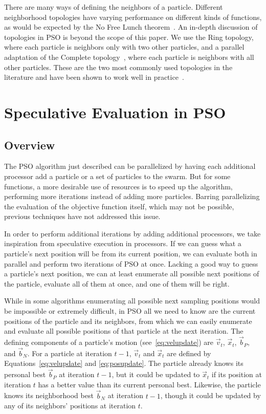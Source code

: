 \documentclass[conference,letterpaper]{IEEEtran}
\providecommand{\ppos}{\ensuremath{\Vec{x}}}
\providecommand{\pvel}{\ensuremath{\Vec{v}}}
\providecommand{\nbest}{\ensuremath{\Vec{b}_N}}
\providecommand{\pbest}{\ensuremath{\Vec{b}_P}}
\begin{document}
There are many ways of defining the neighbors of a particle.  Different
neighborhood topologies have varying performance on different kinds of
functions, as would be expected by the No Free Lunch
theorem~\cite{wolpert-tec97}.  An in-depth discussion of topologies in PSO is
beyond the scope of this paper.  We use the Ring topology, where each particle
is neighbors only with two other particles, and a parallel adaptation of the
Complete topology~\cite{mcnabb-cec09}, where each particle is neighbors with
all other particles.  These are the two most commonly used topologies in the
literature and have been shown to work well in practice~\cite{bratton-sis07}.

\section{Speculative Evaluation in PSO}
\label{sec:sepso}
\subsection{Overview}

The PSO algorithm just described can be parallelized by having each additional
processor add a particle or a set of particles to the swarm.  But for some
functions, a more desirable use of resources is to speed up the algorithm,
performing more iterations instead of adding more particles.  Barring
parallelizing the evaluation of the objective function itself, which may not be
possible, previous techniques have not addressed this issue.

In order to perform additional iterations by adding additional processors, we
take inspiration from speculative execution in processors.  If we can guess
what a particle's next position will be from its current position, we can
evaluate both in parallel and perform two iterations of PSO at once.  Lacking
a good way to guess a particle's next position, we can at least enumerate all
possible next positions of the particle, evaluate all of them at once, and one
of them will be right.

While in some algorithms enumerating all possible next sampling positions would
be impossible or extremely difficult, in PSO all we need to know are the
current positions of the particle and its neighbors, from which we can easily
enumerate and evaluate all possible positions of that particle at the next
iteration.  The defining components of a particle's motion
(see~\eqref{eq:velupdate}) are $\pvel_t$, $\ppos_t$, $\pbest$, and $\nbest$.
For a particle at iteration $t-1$, $\pvel_t$ and $\ppos_t$ are defined by
Equations~\eqref{eq:velupdate} and \eqref{eq:posupdate}.  The particle already
knows its personal best $\pbest$ at iteration $t-1$, but it could be updated to
$\ppos_t$ if its position at iteration $t$ has a better value than its current
personal best.  Likewise, the particle knows its neighborhood best $\nbest$ at
iteration $t-1$, though it could be updated by any of its neighbors' positions
at iteration $t$.
\end{document}
